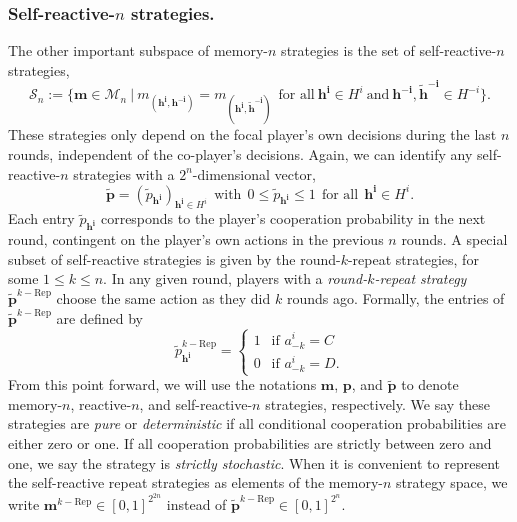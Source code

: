 \documentclass[9pt,twoside,lineno]{pnas-new}
\theoremstyle{plainCl1}
\theoremstyle{plainCl2}
\begin{document}
\noindent
\subsubsection*{Self-reactive-$n$ strategies.}
The other important subspace of memory-$n$ strategies is the set of self-reactive-$n$ strategies, 
\begin{equation}
\mathcal{S}_n:=\Big\{ \mathbf{m}\!\in\!\mathcal{M}_n ~\Big|~ m_{(\mathbf{h^i},\mathbf{h^{-i}})}\!=\!m_{(\mathbf{h^i},\mathbf{\tilde h^{-i}})}~~\text{for all}~\mathbf{h^i}\!\in\!H^i~\text{and}~\mathbf{h^{-i}},\mathbf{\tilde h^{-i}}\!\in\!H^{-i}\Big\}.
\end{equation}
These strategies only depend on the focal player's own decisions during the last $n$ rounds, independent of the co-player's decisions. 
Again, we can identify any self-reactive-$n$ strategies with a $2^n$-dimensional vector, 
\begin{equation}
\mathbf{\tilde{p}} = (\tilde{p}_\mathbf{h^{i}})_{\mathbf{h^{i}} \in H^i}  ~~\text{with}~~ 0\!\le\!\tilde p_\mathbf{h^i}\!\le\!1 ~~\text{for all}~~ \mathbf{h^i}\!\in\! H^i.
\end{equation}
Each entry $\tilde{p}_{\mathbf{h^{i}}}$ corresponds to the player's cooperation
probability in the next round, contingent on the player's own actions in
the previous $n$ rounds.
A special subset of self-reactive strategies is given by the round-$k$-repeat strategies, for some $1\le
k\le n$. 
In any given round, players with a {\it round-$k$-repeat strategy} $\mathbf{\tilde p}^{k-\text{Rep}}$ choose the same action as they did $k$ rounds ago. 
Formally, the entries of $\mathbf{\tilde p}^{k-\text{Rep}}$ are defined by
\begin{equation} \label{Eq:Repeat}
\tilde p^{k-\text{Rep}}_\mathbf{h^i} =
\left\{
\begin{array}{l}
1~~ \text{ if } a^i_{-k}\!=\!C\\[0.1cm]
0~~ \text{ if } a^i_{-k}\!=\!D.
\end{array}
\right.
\end{equation}
From this point forward, we will use the notations $\mathbf{m}$, $\mathbf{p}$,
and $\mathbf{\tilde{p}}$ to denote memory-$n$, reactive-$n$, and
self-reactive-$n$ strategies, respectively. 
We say these strategies are {\it pure} or {\it deterministic} if all conditional cooperation probabilities are either zero or one. 
If all cooperation probabilities are strictly between zero and one, we say the strategy is {\it strictly stochastic}. 
When it is convenient to represent the self-reactive repeat strategies as elements of the memory-$n$ strategy space, we write $\mathbf{m}^{k-\text{Rep}}\!\in\![0,1]^{2^{2n}}$ instead of $\mathbf{\tilde p}^{k-\text{Rep}}\!\in\![0,1]^{2^n}$.
\end{document}
